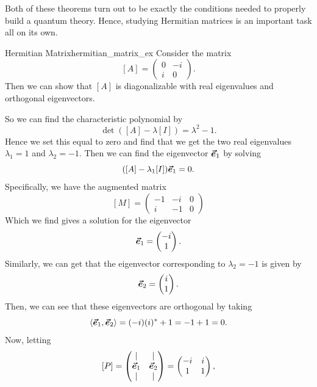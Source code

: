             Both of these theorems turn out to be exactly the conditions needed to properly build a quantum theory. Hence, studying Hermitian matrices is an important task all on its own.  
            
            \begin{ex}{Hermitian Matrix}{hermitian_matrix_ex}
                Consider the matrix
                \[
                [A]=\begin{pmatrix} 0 & -i \\ i & 0 \end{pmatrix}.
                \]
                Then we can show that $[A]$ is diagonalizable with real eigenvalues and orthogonal eigenvectors.  
                
                So we can find the characteristic polynomial by
                \[
                \det([A]-\lambda [I])=\lambda^2 - 1.
                \]
                Hence we set this equal to zero and find that we get the two real eigenvalues $\lambda_1=1$ and $\lambda_2=-1$.  Then we can find the eigenvector $\boldsymbol{\vec{e}}_1$ by solving
                \[
                ([A]-\lambda_1 [I])\boldsymbol{\vec{e}}_1 = 0.
                \]
                Specifically, we have the augmented matrix
                \[
                [M] = \left( \begin{array}{cc|c}
                    -1 & -i & 0 \\
                    i & -1 & 0
                \end{array}\right)
                \]
                Which we find gives a solution for the eigenvector 
                \[
                \boldsymbol{\vec{e}}_1 = \begin{pmatrix} -i \\ 1\end{pmatrix}.
                \]
                Similarly, we can get that the eigenvector corresponding to $\lambda_2=-1$ is given by 
                \[
                \boldsymbol{\vec{e}}_2=\begin{pmatrix} i \\ 1 \end{pmatrix}.
                \]
                Then, we can see that these eigenvectors are orthogonal by taking
                \[
                \langle \boldsymbol{\vec{e}}_1,\boldsymbol{\vec{e}}_2 \rangle = (-i)(i)^* + 1 = -1+1 = 0.
                \]
                Now, letting
                \[
                [P]=\begin{pmatrix} \vert & \vert \\ \boldsymbol{\vec{e}}_1 & \boldsymbol{\vec{e}}_2 \\ \vert & \vert \end{pmatrix} = \begin{pmatrix} -i & i \\ 1 & 1 \end{pmatrix}, 
\]
\end{ex}
